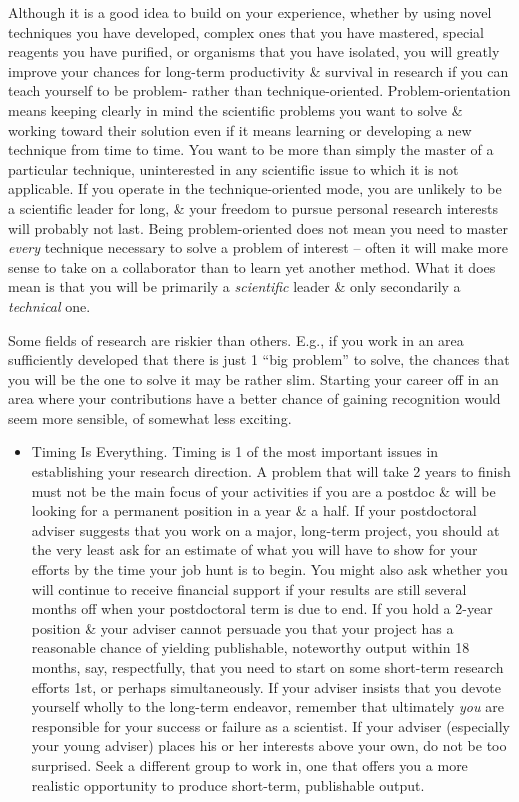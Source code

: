 \documentclass{article}
\begin{document}
\begin{enumerate}
\begin{itemize}
		Although it is a good idea to build on your experience, whether by using novel techniques you have developed, complex ones that you have mastered, special reagents you have purified, or organisms that you have isolated, you will greatly improve your chances for long-term productivity \& survival in research if you can teach yourself to be problem- rather than technique-oriented. Problem-orientation means keeping clearly in mind the scientific problems you want to solve \& working toward their solution even if it means learning or developing a new technique from time to time. You want to be more than simply the master of a particular technique, uninterested in any scientific issue to which it is not applicable. If you operate in the technique-oriented mode, you are unlikely to be a scientific leader for long, \& your freedom to pursue personal research interests will probably not last. Being problem-oriented does not mean you need to master {\it every} technique necessary to solve a problem of interest -- often it will make more sense to take on a collaborator than to learn yet another method. What it does mean is that you will be primarily a {\it scientific} leader \& only secondarily a {\it technical} one.

		Some fields of research are riskier than others. E.g., if you work in an area sufficiently developed that there is just 1 ``big problem'' to solve, the chances that you will be the one to solve it may be rather slim. Starting your career off in an area where your contributions have a better chance of gaining recognition would seem more sensible, of somewhat less exciting.
		\begin{itemize}
			\item {\sf Timing Is Everything.} Timing is 1 of the most important issues in establishing your research direction. A problem that will take 2 years to finish must not be the main focus of your activities if you are a postdoc \& will be looking for a permanent position in a year \& a half. If your postdoctoral adviser suggests that you work on a major, long-term project, you should at the very least ask for an estimate of what you will have to show for your efforts by the time your job hunt is to begin. You might also ask whether you will continue to receive financial support if your results are still several months off when your postdoctoral term is due to end. If you hold a 2-year position \& your adviser cannot persuade you that your project has a reasonable chance of yielding publishable, noteworthy output within 18 months, say, respectfully, that you need to start on some short-term research efforts 1st, or perhaps simultaneously. If your adviser insists that you devote yourself wholly to the long-term endeavor, remember that ultimately {\it you} are responsible for your success or failure as a scientist. If your adviser (especially your young adviser) places his or her interests above your own, do not be too surprised. Seek a different group to work in, one that offers you a more realistic opportunity to produce short-term, publishable output.


\end{itemize}
\end{itemize}
\end{enumerate}
\end{document}
